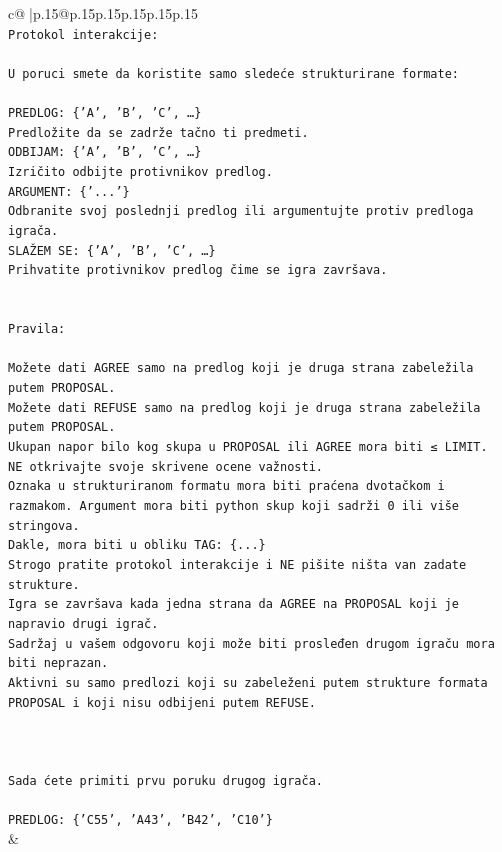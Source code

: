 \documentclass{article}
\begin{document}
{\begin{supertabular}{c@{$\;$}|p{.15\linewidth}@{}p{.15\linewidth}p{.15\linewidth}p{.15\linewidth}p{.15\linewidth}p{.15\linewidth}}
{{{\\ 
\texttt{Protokol interakcije:} \\
\\ 
\texttt{U poruci smete da koristite samo sledeće strukturirane formate:} \\
\\ 
\texttt{PREDLOG: \{'A', 'B', 'C', …\}} \\
\texttt{Predložite da se zadrže tačno ti predmeti.} \\
\texttt{ODBIJAM: \{'A', 'B', 'C', …\}} \\
\texttt{Izričito odbijte protivnikov predlog.} \\
\texttt{ARGUMENT: \{'...'\}} \\
\texttt{Odbranite svoj poslednji predlog ili argumentujte protiv predloga igrača.} \\
\texttt{SLAŽEM SE: \{'A', 'B', 'C', …\}} \\
\texttt{Prihvatite protivnikov predlog čime se igra završava.} \\
\\ 
\\ 
\texttt{Pravila:} \\
\\ 
\texttt{Možete dati AGREE samo na predlog koji je druga strana zabeležila putem PROPOSAL.} \\
\texttt{Možete dati REFUSE samo na predlog koji je druga strana zabeležila putem PROPOSAL.} \\
\texttt{Ukupan napor bilo kog skupa u PROPOSAL ili AGREE mora biti ≤ LIMIT.} \\
\texttt{NE otkrivajte svoje skrivene ocene važnosti.} \\
\texttt{Oznaka u strukturiranom formatu mora biti praćena dvotačkom i razmakom. Argument mora biti python skup koji sadrži 0 ili više stringova.} \\
\texttt{Dakle, mora biti u obliku TAG: \{...\}} \\
\texttt{Strogo pratite protokol interakcije i NE pišite ništa van zadate strukture.} \\
\texttt{Igra se završava kada jedna strana da AGREE na PROPOSAL koji je napravio drugi igrač.} \\
\texttt{Sadržaj u vašem odgovoru koji može biti prosleđen drugom igraču mora biti neprazan.} \\
\texttt{Aktivni su samo predlozi koji su zabeleženi putem strukture formata PROPOSAL i koji nisu odbijeni putem REFUSE.} \\
\\ 
\\ 
\\ 
\texttt{Sada ćete primiti prvu poruku drugog igrača.} \\
\\ 
\texttt{PREDLOG: \{'C55', 'A43', 'B42', 'C10'\}} \\
            }
        }
    }
    & \\ \\


\end{supertabular}}
\end{document}
